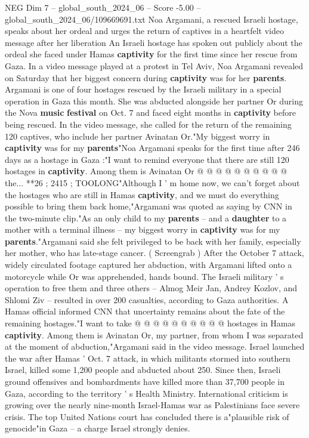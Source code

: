 \begin{textsample}{NEG Dim 7 – global\_south\_2024\_06 – Score -5.00 – global\_south\_2024\_06/109669691.txt}  \label{ex:f7_neg_368}
Noa Argamani, a rescued Israeli hostage, speaks about her ordeal and urges the return of captives in a heartfelt video message after her liberation An Israeli hostage has spoken out publicly about the ordeal she faced under Hamas \textbf{captivity} for the first time since her rescue from Gaza.
In a video message played at a protest in Tel Aviv, Noa Argamani revealed on Saturday that her biggest concern during \textbf{captivity} was for her \textbf{parents}.
Argamani is one of four hostages rescued by the Israeli military in a special operation in Gaza this month.
She was abducted alongside her partner Or during the Nova \textbf{music} \textbf{festival} on Oct. 7 and faced eight months in \textbf{captivity} before being rescued.
In the video message, she called for the return of the remaining 120 captives, who include her partner Avinatan Or."My biggest worry in \textbf{captivity} was for my \textbf{parents}"Noa Argamani speaks for the first time after 246 days as a hostage in Gaza :"I want to remind everyone that there are still 120 hostages in \textbf{captivity}.
Among them is Avinatan Or @ @ @ @ @ @ @ @ @ @ the... **26 ; 2415 ; TOOLONG"Although I ' m home now, we can't forget about the hostages who are still in Hamas \textbf{captivity}, and we must do everything possible to bring them back home,"Argamani was quoted as saying by CNN in the two-minute clip."As an only child to my \textbf{parents} -- and a \textbf{daughter} to a mother with a terminal illness -- my biggest worry in \textbf{captivity} was for my \textbf{parents}."Argamani said she felt privileged to be back with her family, especially her mother, who has late-stage cancer. ( Screengrab ) After the October 7 attack, widely circulated footage captured her abduction, with Argamani lifted onto a motorcycle while Or was apprehended, hands bound.
The Israeli military ' s operation to free them and three others -- Almog Meir Jan, Andrey Kozlov, and Shlomi Ziv -- resulted in over 200 casualties, according to Gaza authorities.
A Hamas official informed CNN that uncertainty remains about the fate of the remaining hostages."I want to take @ @ @ @ @ @ @ @ @ @ hostages in Hamas \textbf{captivity}.
Among them is Avinatan Or, my partner, from whom I was separated at the moment of abduction,"Argamani said in the video message.
Israel launched the war after Hamas ' Oct. 7 attack, in which militants stormed into southern Israel, killed some 1,200 people and abducted about 250.
Since then, Israeli ground offensives and bombardments have killed more than 37,700 people in Gaza, according to the territory ' s Health Ministry.
International criticism is growing over the nearly nine-month Israel-Hamas war as Palestinians face severe crisis.
The top United Nations court has concluded there is a"plausible risk of genocide"in Gaza -- a charge Israel strongly denies.

\end{textsample}
